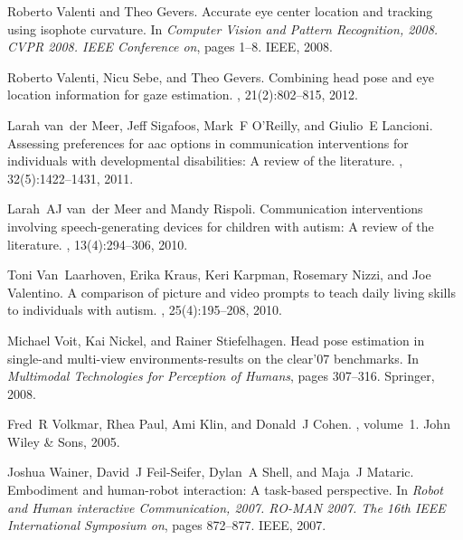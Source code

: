 \documentclass{ut-thesis}
\begin{document}
\begin{thebibliography}{100}
Roberto Valenti and Theo Gevers.
\newblock Accurate eye center location and tracking using isophote curvature.
\newblock In {\em Computer Vision and Pattern Recognition, 2008. CVPR 2008.
  IEEE Conference on}, pages 1--8. IEEE, 2008.

Roberto Valenti, Nicu Sebe, and Theo Gevers.
\newblock Combining head pose and eye location information for gaze estimation.
, 21(2):802--815, 2012.

Larah van~der Meer, Jeff Sigafoos, Mark~F O’Reilly, and Giulio~E Lancioni.
\newblock Assessing preferences for aac options in communication interventions
  for individuals with developmental disabilities: A review of the literature.
, 32(5):1422--1431, 2011.

Larah~AJ van~der Meer and Mandy Rispoli.
\newblock Communication interventions involving speech-generating devices for
  children with autism: A review of the literature.
, 13(4):294--306, 2010.

Toni Van~Laarhoven, Erika Kraus, Keri Karpman, Rosemary Nizzi, and Joe
  Valentino.
\newblock A comparison of picture and video prompts to teach daily living
  skills to individuals with autism.
,
  25(4):195--208, 2010.

Michael Voit, Kai Nickel, and Rainer Stiefelhagen.
\newblock Head pose estimation in single-and multi-view environments-results on
  the clear’07 benchmarks.
\newblock In {\em Multimodal Technologies for Perception of Humans}, pages
  307--316. Springer, 2008.

Fred~R Volkmar, Rhea Paul, Ami Klin, and Donald~J Cohen.
, volume~1.
\newblock John Wiley \& Sons, 2005.

Joshua Wainer, David~J Feil-Seifer, Dylan~A Shell, and Maja~J Mataric.
\newblock Embodiment and human-robot interaction: A task-based perspective.
\newblock In {\em Robot and Human interactive Communication, 2007. RO-MAN 2007.
  The 16th IEEE International Symposium on}, pages 872--877. IEEE, 2007.


\end{thebibliography}
\end{document}
